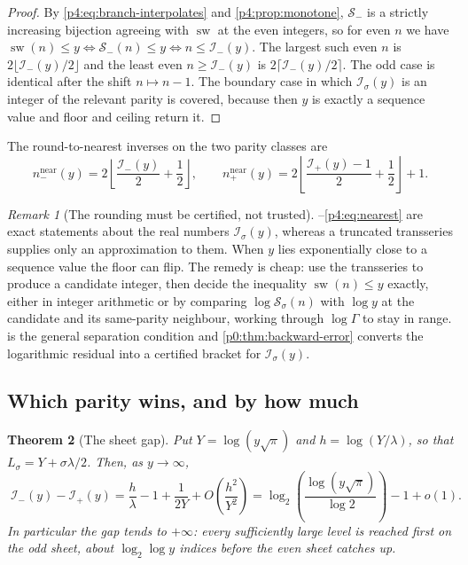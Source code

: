 \documentclass[11pt,a4paper,oneside]{book}
\theoremstyle{plain}
\newtheorem{theorem}{Theorem}[chapter]
\theoremstyle{definition}
\theoremstyle{remark}
\newtheorem{remark}[theorem]{Remark}
\begin{document}
\begin{proof}
By \cref{p4:eq:branch-interpolates} and \cref{p4:prop:monotone},
$\mathcal S_-$ is a strictly increasing bijection agreeing with
$\operatorname{sw}$ at the even integers, so for even $n$ we have
$\operatorname{sw}(n)\le y\iff\mathcal S_-(n)\le y\iff n\le\mathcal I_-(y)$.
The largest such even $n$ is $2\lfloor\mathcal I_-(y)/2\rfloor$ and the least
even $n\ge\mathcal I_-(y)$ is $2\lceil\mathcal I_-(y)/2\rceil$.  The odd case
is identical after the shift $n\mapsto n-1$.  The boundary case in which
$\mathcal I_\sigma(y)$ is an integer of the relevant parity is covered,
because then $y$ is exactly a sequence value and floor and ceiling return it.
\end{proof}

The round-to-nearest inverses on the two parity classes are
\begin{equation}
  n^{\mathrm{near}}_-(y)
   =2\left\lfloor\frac{\mathcal I_-(y)}2+\frac12\right\rfloor,
  \qquad
  n^{\mathrm{near}}_+(y)
   =2\left\lfloor\frac{\mathcal I_+(y)-1}2+\frac12\right\rfloor+1 .
  \label{p4:eq:nearest}
\end{equation}

\begin{remark}[The rounding must be certified, not trusted]
\label{p4:rem:certify-rounding}
--\cref{p4:eq:nearest} are exact statements about the
real numbers $\mathcal I_\sigma(y)$, whereas a truncated transseries supplies
only an approximation to them.  When $y$ lies exponentially close to a
sequence value the floor can flip.  The remedy is cheap: use the transseries
to produce a candidate integer, then decide the inequality
$\operatorname{sw}(n)\le y$ exactly, either in integer arithmetic or by
comparing $\log\mathcal S_\sigma(n)$ with $\log y$ at the candidate and its
same-parity neighbour, working through $\log\Gamma$ to stay in range.
 is the general separation condition and
\cref{p0:thm:backward-error} converts the logarithmic residual into a
certified bracket for $\mathcal I_\sigma(y)$.
\end{remark}

\subsection{Which parity wins, and by how much}

\begin{theorem}[The sheet gap]
\label{p4:thm:sheet-gap}
Put $Y=\log(y\sqrt\pi)$ and $h=\log(Y/\lambda)$, so that
$L_\sigma=Y+\sigma\lambda/2$.  Then, as $y\to\infty$,
\begin{equation}
  \boxed{\;
  \mathcal I_-(y)-\mathcal I_+(y)
   =\frac h\lambda-1+\frac1{2Y}+O\!\left(\frac{h^{2}}{Y^{2}}\right)
   =\log_2\!\left(\frac{\log(y\sqrt\pi)}{\log2}\right)-1+o(1).\;}
  \label{p4:eq:sheet-gap}
\end{equation}
In particular the gap tends to $+\infty$: every sufficiently large level is
reached first on the \emph{odd} sheet, about $\log_2\log y$ indices before the
even sheet catches up.
\end{theorem}
\end{document}

